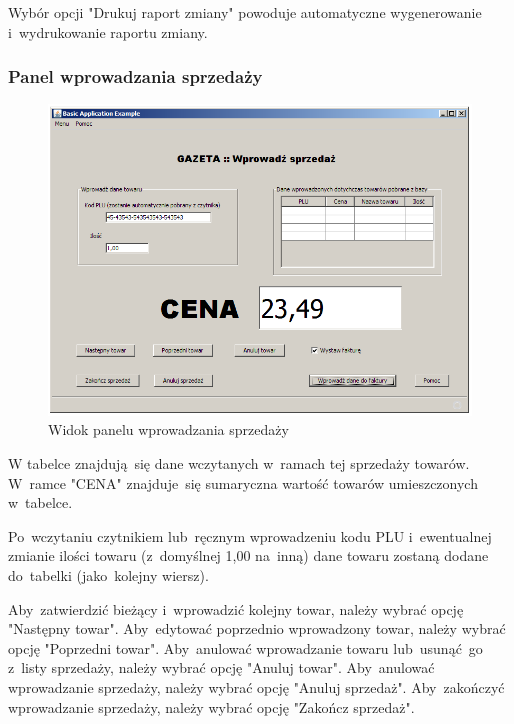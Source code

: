 Wybór opcji "Drukuj raport zmiany" powoduje automatyczne wygenerowanie i~wydrukowanie raportu zmiany.
\clearpage
\subsubsection{Panel wprowadzania sprzedaży}
\begin{figure}[h]
\includegraphics[height=1\textwidth,angle=90,keepaspectratio]{gfx/sprzedaz.png}
\caption{Widok panelu wprowadzania sprzedaży}
\end{figure}
W tabelce znajdują~się dane wczytanych w~ramach tej sprzedaży towarów. W~ramce "CENA" znajduje~się sumaryczna wartość towarów umieszczonych w~tabelce.

Po~wczytaniu czytnikiem lub~ręcznym wprowadzeniu kodu PLU i~ewentualnej zmianie ilości towaru (z~domyślnej 1,00 na~inną) dane towaru zostaną dodane do~tabelki (jako~kolejny wiersz).

Aby~zatwierdzić bieżący i~wprowadzić kolejny towar, należy wybrać opcję "Następny towar". Aby~edytować poprzednio wprowadzony towar, należy wybrać opcję "Poprzedni towar". Aby~anulować wprowadzanie towaru lub~usunąć~go z~listy sprzedaży, należy wybrać opcję "Anuluj towar". Aby~anulować wprowadzanie sprzedaży, należy wybrać opcję "Anuluj sprzedaż". Aby~zakończyć wprowadzanie sprzedaży, należy wybrać opcję "Zakończ sprzedaż".

